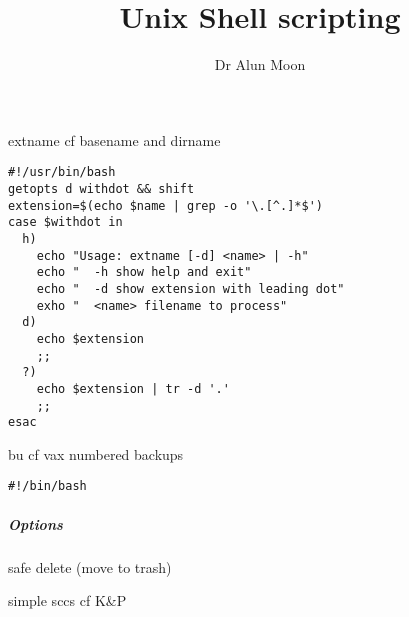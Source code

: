 \documentclass{article}
\title{Unix Shell scripting}
\author{Dr Alun Moon}
\begin{document}
\setlength{\parindent}{0pt}
\setlength{\parskip}{6pt}
extname cf basename and dirname

\begin{verbatim}
#!/usr/bin/bash
getopts d withdot && shift
extension=$(echo $name | grep -o '\.[^.]*$')
case $withdot in
  h)
    echo "Usage: extname [-d] <name> | -h"
    echo "  -h show help and exit"
    echo "  -d show extension with leading dot"
    exho "  <name> filename to process"
  d)
    echo $extension
    ;;
  ?)
    echo $extension | tr -d '.'
    ;;
esac
\end{verbatim}
bu cf vax numbered backups
\begin{verbatim}
#!/bin/bash

\end{verbatim}

\subparagraph{Options}

safe delete (move to trash)

simple sccs cf K\&P


\end{document}
